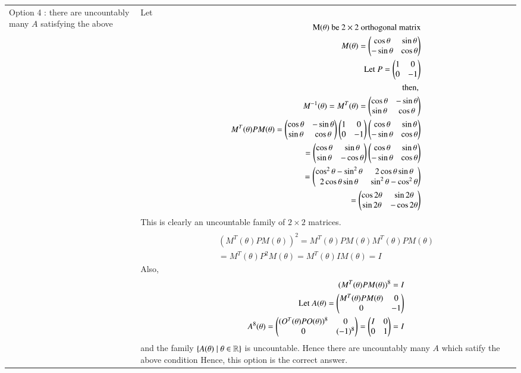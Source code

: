 \documentclass[journal,12pt,twocolumn]{IEEEtran}
\begin{document}
\begin{table}[h!]
\begin{center}
\begin{tabular}{ | m{6cm} | m{12cm}| } \hline 
Option 4 :  there are uncountably many  $A$ satisfying the above & Let {\begin{align*}
 \text{M}(\theta)\text{ be } 2 \times 2 \text{  orthogonal matrix} \\
M(\theta)= \begin{pmatrix}\cos \theta& \sin \theta\\-\sin\theta&\cos \theta\end{pmatrix}\\
\text{ Let    } P = \begin{pmatrix} 1 & 0 \\ 0 & -1 \end{pmatrix}\\
\text{ then, }\\
M^{-1}(\theta) = M^T(\theta) = \begin{pmatrix} \cos \theta & -\sin \theta \\ \sin \theta & \cos \theta \end{pmatrix}\\
M^T(\theta) P M(\theta) =\begin{pmatrix} \cos \theta & -\sin \theta \\ \sin \theta & \cos \theta\end{pmatrix} \begin{pmatrix}1 & 0 \\ 0 & -1 \end{pmatrix} \begin{pmatrix} \cos \theta & \sin \theta \\ -\sin \theta & \cos \theta \end{pmatrix}\\
= \begin{pmatrix} \cos \theta & \sin \theta \\ \sin \theta & -\cos \theta\end{pmatrix}\begin{pmatrix}\cos \theta & \sin \theta \\ -\sin \theta & \cos \theta \end{pmatrix} \\= \begin{pmatrix}\cos^2 \theta - \sin^2 \theta & 2 \cos \theta \sin \theta \\ 2 \cos \theta \sin \theta & \sin^2 \theta - \cos^2 \theta \end{pmatrix}\\
= \begin{pmatrix}\cos 2 \theta & \sin 2 \theta \\ \sin 2\theta & -\cos 2 \theta \end{pmatrix}
\end{align*}}
This is clearly an uncountable family of $2 \times 2$ matrices.\\&
{\begin{align*}
(M^T(\theta) P M(\theta))^2 = M^T(\theta) P M(\theta)  M^T(\theta) P M(\theta)\\ 
= M^T(\theta)P^2 M(\theta) = M^T(\theta)I M(\theta) = I
\end{align*}}
Also,
{\begin{align*}
(M^T(\theta) P M(\theta))^8 = I\\
\text{Let } A(\theta) = \begin{pmatrix}M^T(\theta) P M(\theta) & 0 \\ 0 & -1 \end{pmatrix}\\
A^8(\theta) = \begin{pmatrix} (O^T(\theta) P O(\theta))^8 & 0 \\ 0 & (-1)^8\end{pmatrix} = \begin{pmatrix}I & 0 \\ 0 & 1 \end{pmatrix}= I\\
\end{align*}}
and the family $\{ A(\theta)\mid \theta \in \Bbb R \}$ is uncountable. Hence there are uncountably many $A$ which satify the above condition
Hence, this option is the correct answer.
\\  \hline

\end{tabular}
\end{center}
\end{table}
\end{document}
